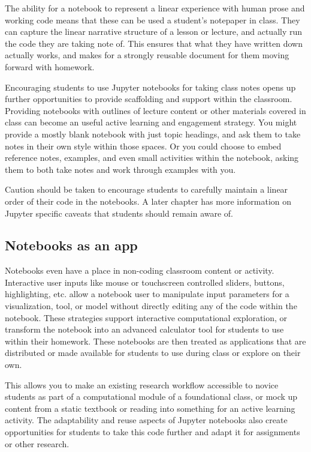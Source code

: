 \documentclass[]{book}
\begin{document}
The ability for a notebook to represent a linear experience with human
prose and working code means that these can be used a student's
notepaper in class. They can capture the linear narrative structure of a
lesson or lecture, and actually run the code they are taking note of.
This ensures that what they have written down actually works, and makes
for a strongly reusable document for them moving forward with homework.

Encouraging students to use Jupyter notebooks for taking class notes
opens up further opportunities to provide scaffolding and support within
the classroom. Providing notebooks with outlines of lecture content or
other materials covered in class can become an useful active learning
and engagement strategy. You might provide a mostly blank notebook with
just topic headings, and ask them to take notes in their own style
within those spaces. Or you could choose to embed reference notes,
examples, and even small activities within the notebook, asking them to
both take notes and work through examples with you.

Caution should be taken to encourage students to carefully maintain a
linear order of their code in the notebooks. A later chapter has more
information on Jupyter specific caveats that students should remain
aware of.

\subsection{Notebooks as an app}\label{notebooks-as-an-app}

Notebooks even have a place in non-coding classroom content or activity.
Interactive user inputs like mouse or touchscreen controlled sliders,
buttons, highlighting, etc. allow a notebook user to manipulate input
parameters for a visualization, tool, or model without directly editing
any of the code within the notebook. These strategies support
interactive computational exploration, or transform the notebook into an
advanced calculator tool for students to use within their homework.
These notebooks are then treated as applications that are distributed or
made available for students to use during class or explore on their own.

This allows you to make an existing research workflow accessible to
novice students as part of a computational module of a foundational
class, or mock up content from a static textbook or reading into
something for an active learning activity. The adaptability and reuse
aspects of Jupyter notebooks also create opportunities for students to
take this code further and adapt it for assignments or other research.
\end{document}
